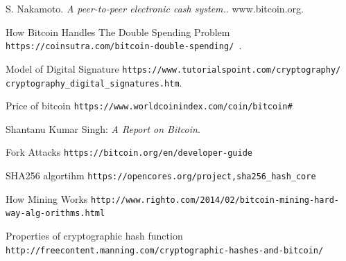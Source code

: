 \documentclass[12pt,a4paper]{report}
\begin{document}
\begin{justify}

\centering

\begin{thebibliography}{9}
S. Nakamoto. 
\textit{A peer-to-peer electronic cash system.}.
www.bitcoin.org.
 
How Bitcoin Handles The Double Spending Problem
\texttt{https://coinsutra.com/bitcoin-double-spending/ }. 
 
 Model of Digital Signature
\texttt{https://www.tutorialspoint.com/cryptography/ \newline cryptography\_digital\_signatures.htm}.

 Price of bitcoin
\texttt{https://www.worldcoinindex.com/coin/bitcoin#}

Shantanu Kumar Singh: 
\textit{A Report on Bitcoin}.

 Fork Attacks
\texttt{https://bitcoin.org/en/developer-guide}

 SHA256 algortihm
\texttt{https://opencores.org/project,sha256\_hash\_core}

 How Mining Works
\texttt{http://www.righto.com/2014/02/bitcoin\newline -mining-hard-way-alg-orithms.html}

 Properties of cryptographic hash function 
\texttt{http://freecontent.manning.com/\newline cryptographic-hashes-and-bitcoin/}



\end{thebibliography}







\end{justify}
\end{document}

